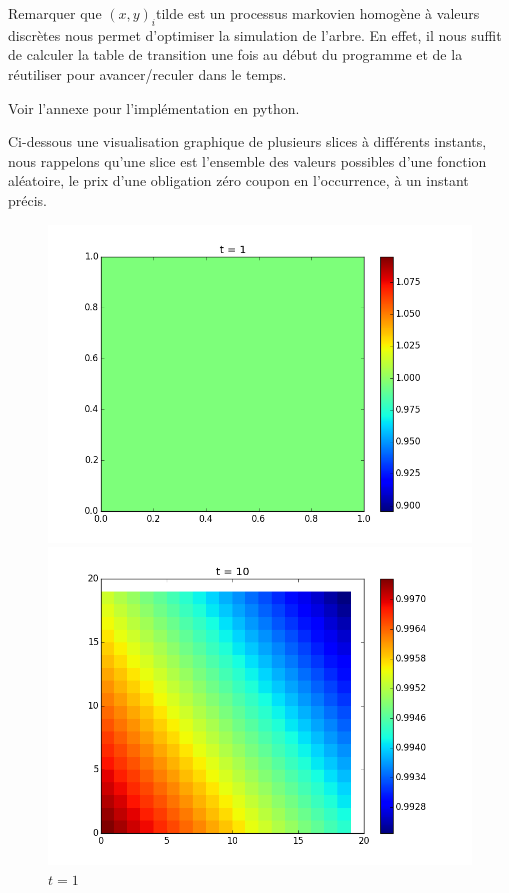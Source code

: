 

Remarquer que $(x, y)_i$tilde est un processus markovien homogène à valeurs discrètes nous permet d'optimiser la simulation de l'arbre. En effet, il nous suffit de calculer la table de transition une fois au début du programme et de la réutiliser pour avancer/reculer dans le temps. 



Voir l'annexe pour l'implémentation en python.

Ci-dessous une visualisation graphique de plusieurs slices à différents instants, nous rappelons qu'une slice est l'ensemble des valeurs possibles d'une fonction aléatoire, le prix d'une obligation zéro coupon en l'occurrence, à un instant précis.

\begin{figure}[H]
 \begin{minipage}[b]{.46\linewidth}
  \centering    \includegraphics[scale=0.2]{img/slices2d/sl_1.png}
  \caption{$t = 1$ \label{fig1}}
 \end{minipage} \hfill
 \begin{minipage}[b]{.46\linewidth}
     \centering    \includegraphics[scale=0.2]{img/slices2d/sl_10.png}

\end{minipage}
\end{figure}
